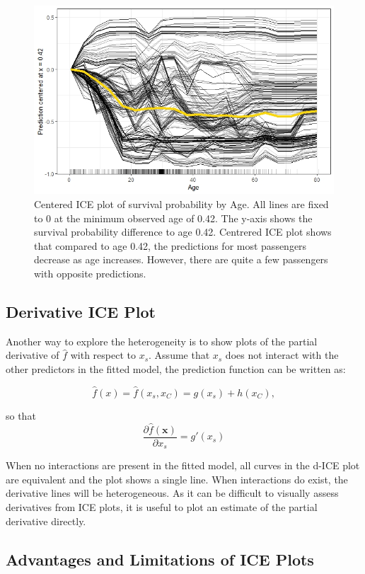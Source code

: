 \documentclass[
]{krantz}
\begin{document}
\begin{figure}

{\centering \includegraphics[width=0.8\linewidth]{images/PDP_Plot_6} 

}

\caption{Centered ICE plot of survival probability by Age. All lines are fixed to 0 at the minimum observed age of 0.42. The y-axis shows the survival probability difference to age 0.42. Centrered ICE plot shows that compared to age 0.42, the predictions for most passengers decrease as age increases. However, there are quite a few passengers with opposite predictions.}\label{fig:plot6}
\end{figure}

\hypertarget{derivative-ice-plot}{%
\subsection{Derivative ICE Plot}\label{derivative-ice-plot}}

Another way to explore the heterogeneity is to show plots of the partial derivative
of \(\hat{f}\) with respect to \(x_s\). Assume that \(x_s\) does not interact
with the other predictors in the fitted model, the prediction function can be written as:

\[\hat{f}(x) = \hat{f}(x_s,x_C) = g(x_s) + h(x_C),\]

so that \[\frac{\partial{\hat{f}(\mathbf{x})}}{\partial x_s} = g'(x_s)\]

When no interactions are present in the fitted model, all curves in the d-ICE plot are equivalent and the plot shows a single line. When interactions do exist, the derivative lines will be heterogeneous. As it can be difficult to visually assess derivatives from ICE plots, it is useful to plot an estimate of the partial derivative directly.\citep{Goldstein2013}

\hypertarget{advantages-and-limitations-of-ice-plots}{%
\subsection{Advantages and Limitations of ICE Plots}\label{advantages-and-limitations-of-ice-plots}}
\end{document}
